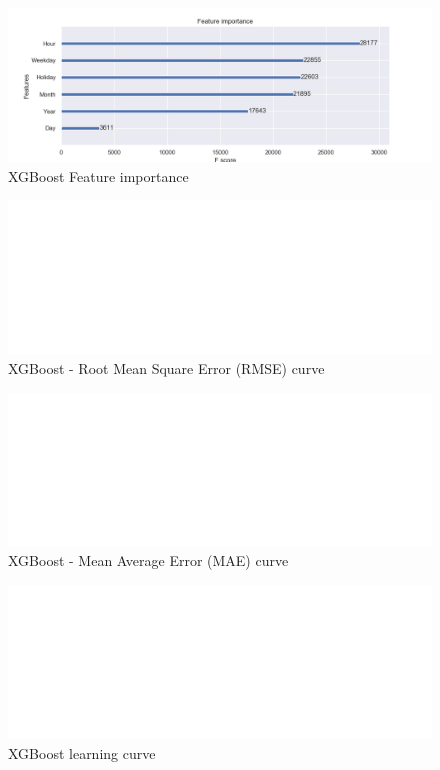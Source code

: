\begin{figure}[!htpb]
\centering
\includegraphics[width=1.0\textwidth,height=\textheight,keepaspectratio]{Figures/feature_importance_xgboost.png}
\caption{XGBoost Feature importance }
\label{figFeatImp2}
\end{figure}



\begin{figure}[!htpb]
\centering
\includegraphics[width=1.0\textwidth,height=\textheight,keepaspectratio]{Figures/XGBoost_RMSE.png}
\caption{XGBoost - Root Mean Square Error (RMSE) curve}
\label{figXGBrmse}
\end{figure}


\begin{figure}[!htpb]
\centering
\includegraphics[width=1.0\textwidth,height=\textheight,keepaspectratio]{Figures/XGBoost_MAE.png}
\caption{XGBoost - Mean Average Error (MAE) curve}
\label{figXGBmae}
\end{figure}


\begin{figure}[!htpb]
\centering
\includegraphics[width=1.0\textwidth,height=\textheight,keepaspectratio]{Figures/XGBoost_learningcurve.png}
\caption{XGBoost learning curve}
\label{figXGBlearn}
\end{figure}

